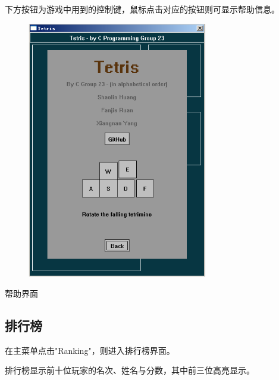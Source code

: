 \documentclass{style/ucasproposal}
\begin{document}
下方按钮为游戏中用到的控制键，鼠标点击对应的按钮则可显示帮助信息。
\begin{center}
\begin{figure}[H]
\center
    \includegraphics[width=0.7\textwidth]{./img/manual/8-help.png}
\end{figure}
帮助界面
\end{center}


\subsection{排行榜}
在主菜单点击"Ranking"，则进入排行榜界面。

排行榜显示前十位玩家的名次、姓名与分数，其中前三位高亮显示。
\end{document}
